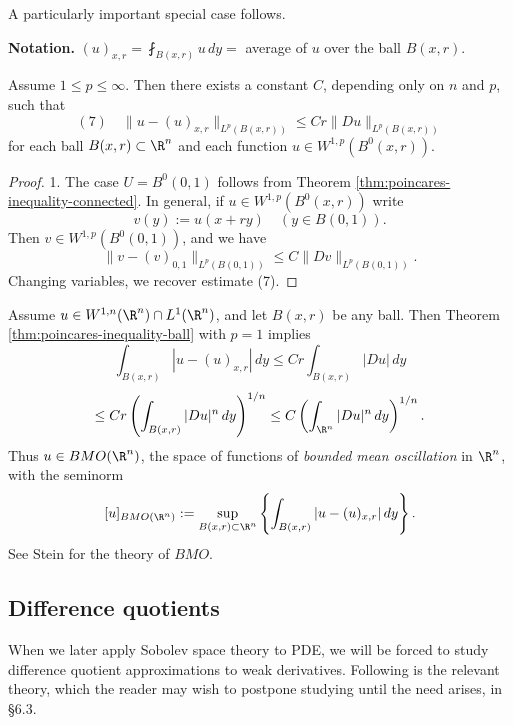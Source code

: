 A particularly important special case follows.

\textbf{Notation.} $(u)_{x,r} = \fint_{B(x,r)} u\,dy =$ average of $u$ over the ball $B(x,r)$.

\begin{theorem}
\label{thm:poincares-inequality-ball}
Assume $1 \le p \le \infty$. Then there exists a constant $C$, depending only on $n$ and $p$, such that
$$(7) \quad \|u - (u)_{x,r}\|_{L^p(B(x,r))} \le Cr\|Du\|_{L^p(B(x,r))}$$
for each ball $B(x,r) \subset \R^n$ and each function $u \in W^{1,p}(B^0(x,r))$.
\end{theorem}

\begin{proof}
1. The case $U = B^0(0,1)$ follows from Theorem \ref{thm:poincares-inequality-connected}. In general, if $u \in W^{1,p}(B^0(x,r))$ write
$$v(y) := u(x + ry) \quad (y \in B(0,1)).$$
Then $v \in W^{1,p}(B^0(0,1))$, and we have
$$\|v - (v)_{0,1}\|_{L^p(B(0,1))} \le C\|Dv\|_{L^p(B(0,1))}.$$
Changing variables, we recover estimate (7).
\end{proof}

\begin{remark}
\label{rem:bmo-remark}
Assume $u \in W^{1,n}(\R^n) \cap L^1(\R^n)$, and let $B(x,r)$ be any ball. Then Theorem \ref{thm:poincares-inequality-ball} with $p = 1$ implies
$$\int_{B(x,r)} |u - (u)_{x,r}|\, dy \le Cr\int_{B(x,r)} |Du|\, dy$$
$$\le Cr \left(\int_{B(x,r)} |Du|^n\, dy\right)^{1/n} \le C\left(\int_{\R^n} |Du|^n\, dy\right)^{1/n}.$$
Thus $u \in BMO(\R^n)$, the space of functions of \textit{bounded mean oscillation} in $\R^n$, with the seminorm
$$[u]_{BMO(\R^n)} := \sup_{B(x,r) \subset \R^n} \left\{\int_{B(x,r)} |u - (u)_{x,r}|\, dy\right\}.$$
See Stein \cite{Stein1993} for the theory of $BMO$.
\end{remark}

\subsection{Difference quotients}

When we later apply Sobolev space theory to PDE, we will be forced to study difference quotient approximations to weak derivatives. Following is the relevant theory, which the reader may wish to postpone studying until the need arises, in §6.3.

